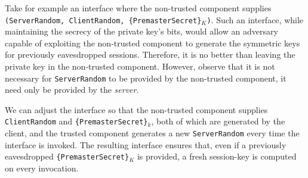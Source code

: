 \documentclass[../main.tex]{subfiles}
\begin{document}
Take for example an interface where the non-trusted component supplies
\texttt{(ServerRandom, ClientRandom, \{PremasterSecret\}$_K$)}. Such
an interface, while maintaining the secrecy of the private key's bits,
would allow an adversary capable of exploiting the non-trusted
component to generate the symmetric keys for previously eavesdropped
sessions. Therefore, it is no better than leaving the private key in
the non-trusted component.  However, observe that it is not necessary
for \texttt{ServerRandom} to be provided by the non-trusted component,
it need only be provided by the \textit{server}.


We can adjust the interface so that the non-trusted component supplies
\texttt{ClientRandom} and \texttt{\{PremasterSecret\}$_k$}, both of
which are generated by the client, and the trusted component generates
a new \texttt{ServerRandom} every time the interface is invoked. The
resulting interface ensures that, even if a previously eavesdropped
\texttt{\{PremasterSecret\}$_K$} is provided, a fresh session-key is
computed on every invocation.
\end{document}
